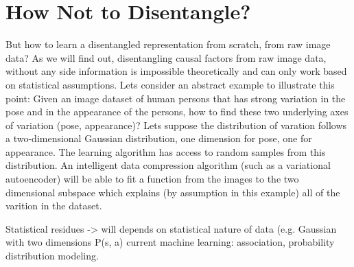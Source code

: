 
	\section{How Not to Disentangle?}
	But how to learn a disentangled representation from scratch, \ie from raw image data?
	As we will find out, disentangling causal factors from raw image data, without any side information is impossible theoretically and can only work based on statistical assumptions.
	Lets consider an abstract example to illustrate this point:
	Given an image dataset of human persons that has strong variation in the pose and in the appearance of the persons, how to find these two underlying axes of variation (pose, appearance)? Lets suppose the distribution of varation follows a two-dimensional Gaussian distribution, one dimension for pose, one for appearance. The learning algorithm has access to random samples from this distribution. An intelligent data compression algorithm (such as a variational autoencoder) will be able to fit a function from the images to the two dimensional subspace which explains (by assumption in this example) all of the varition in the dataset.

	Statistical residues -> will depends on statistical nature of data (e.g. Gaussian with two dimensions P(s, a)
	current machine learning: association, probability distribution modeling.

